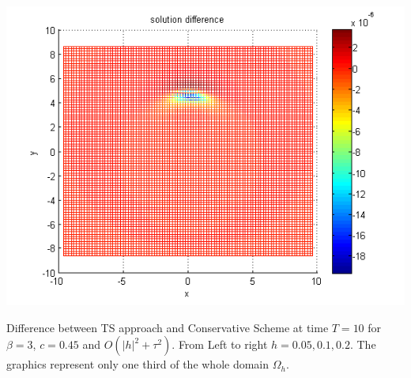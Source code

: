 \documentclass{beamer}
\begin{document}
\begin{frame}
\begin{center}
	\begin{minipage}[b]{0.32\linewidth}
		 \includegraphics[width=\linewidth]{figures/compare_30_bt3_c045_h020.png}
	\end{minipage}
\end{center}
Difference between TS approach and Conservative Scheme at time $T=10$  for $\beta=3$, $c = 0.45$  and $O(|h|^2 + \tau^2)$. From Left to right $h=0.05, 0.1, 0.2$. The graphics represent only one third of the whole domain $\Omega_h$.
\end{frame}

\end{document}
